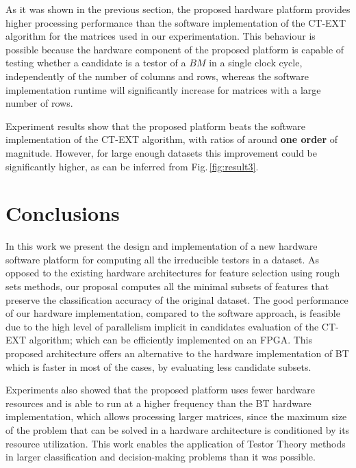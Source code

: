 \documentclass[authoryear,preprint,review,12pt]{elsarticle}
\begin{document}

As it was shown in the previous section, the proposed hardware platform provides higher processing
performance than the software implementation of the CT-EXT
algorithm for the matrices used in our experimentation. 
This behaviour is possible because the hardware
component of the proposed platform is capable of testing whether a 
candidate is a testor of a $BM$ in a single clock cycle,
independently of the number of columns and rows, whereas
the software implementation runtime will significantly
increase for matrices with a large number of rows.

Experiment results show that the proposed platform beats the software implementation of
the CT-EXT algorithm, with ratios of around \textbf{one order} of magnitude. However, for large 
enough datasets this improvement could be significantly higher, as can be inferred from 
Fig.\,\ref{fig:result3}.

\section{Conclusions}
\label{sect:8}
In this work we present the design and implementation of a new hardware software platform for
computing all the irreducible testors in a dataset.  As opposed to the existing hardware 
architectures for feature selection using rough sets methods, our proposal computes all the
minimal subsets of features that preserve the classification accuracy of the original dataset.
The good performance of our hardware implementation, compared to the software approach, is 
feasible due to the high level of parallelism implicit in candidates evaluation of the CT-EXT 
algorithm; which can be efficiently implemented on an FPGA. 
This proposed architecture offers an alternative to the hardware implementation of BT which is 
faster in most of the cases, by evaluating less candidate subsets. 

Experiments also showed that the proposed platform uses fewer hardware resources and is able to run at a higher 
frequency than the BT hardware implementation, which allows processing larger matrices, since the maximum size of 
the problem that can be solved in a hardware architecture is conditioned by its resource utilization. 
This work enables the application of Testor Theory methods in larger classification and decision-making
problems than it was possible.
\end{document}
